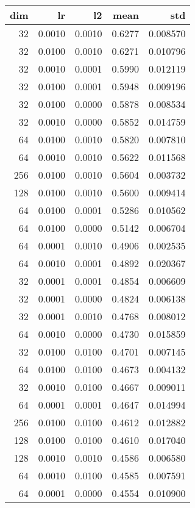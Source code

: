 \begin{tabular}{rrrrr}
\toprule
 dim &      lr &      l2 &    mean &       std \\
\midrule
  32 &  0.0010 &  0.0010 &  0.6277 &  0.008570 \\
  32 &  0.0100 &  0.0010 &  0.6271 &  0.010796 \\
  32 &  0.0010 &  0.0001 &  0.5990 &  0.012119 \\
  32 &  0.0100 &  0.0001 &  0.5948 &  0.009196 \\
  32 &  0.0100 &  0.0000 &  0.5878 &  0.008534 \\
  32 &  0.0010 &  0.0000 &  0.5852 &  0.014759 \\
  64 &  0.0100 &  0.0010 &  0.5820 &  0.007810 \\
  64 &  0.0010 &  0.0010 &  0.5622 &  0.011568 \\
 256 &  0.0100 &  0.0010 &  0.5604 &  0.003732 \\
 128 &  0.0100 &  0.0010 &  0.5600 &  0.009414 \\
  64 &  0.0100 &  0.0001 &  0.5286 &  0.010562 \\
  64 &  0.0100 &  0.0000 &  0.5142 &  0.006704 \\
  64 &  0.0001 &  0.0010 &  0.4906 &  0.002535 \\
  64 &  0.0010 &  0.0001 &  0.4892 &  0.020367 \\
  32 &  0.0001 &  0.0001 &  0.4854 &  0.006609 \\
  32 &  0.0001 &  0.0000 &  0.4824 &  0.006138 \\
  32 &  0.0001 &  0.0010 &  0.4768 &  0.008012 \\
  64 &  0.0010 &  0.0000 &  0.4730 &  0.015859 \\
  32 &  0.0100 &  0.0100 &  0.4701 &  0.007145 \\
  64 &  0.0100 &  0.0100 &  0.4673 &  0.004132 \\
  32 &  0.0010 &  0.0100 &  0.4667 &  0.009011 \\
  64 &  0.0001 &  0.0001 &  0.4647 &  0.014994 \\
 256 &  0.0100 &  0.0100 &  0.4612 &  0.012882 \\
 128 &  0.0100 &  0.0100 &  0.4610 &  0.017040 \\
 128 &  0.0010 &  0.0010 &  0.4586 &  0.006580 \\
  64 &  0.0010 &  0.0100 &  0.4585 &  0.007591 \\
  64 &  0.0001 &  0.0000 &  0.4554 &  0.010900 \\

\end{tabular}
